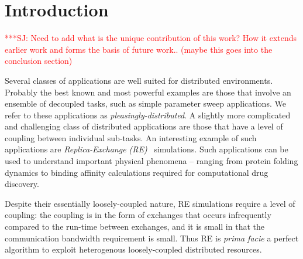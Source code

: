\documentclass{rspublic}
\newcommand{\alnote}[1]{ {\textcolor{blue} { ***AL: #1 }}}
\newcommand{\jhanote}[1]{ {\textcolor{red} { ***SJ: #1 }}}
\newcommand{\alnote}[1]{}
\newcommand{\jhanote}[1]{}
\begin{document}
\begin{abstract}{Replica-Exchange, SAGA, Migol, Fault Tolerance}
  \jhanote{In this paper, we describe the design, development and
    deployment of a unique framework for constructing fault-tolerant
    distributed simulations.}

  \jhanote{Less emphasis on the SAGA/Migol framework: The framework
    consists of two primary components -- SAGA and Migol, is scalable,
    general purpose and extensible.}

  \jhanote{I think this can go: We provide details of a newly
    developed functionality in SAGA -- the Checkpoint and Recovery
    API. Migol is an adaptive Grid middleware, which addresses the
    fault tolerance of Grid applications and services by providing the
    capability to recover applications from checkpoint files
    transparently.  In addition to describing the integration of
    SAGA-CPR with the Migol infrastructure,}
  \alnote{I added a small note about Migol to the abstract (I tried to keep
    it short.)}

  \jhanote{We also outline our experiences with running a large scale,
    general-purpose, SAGA-CPR based Replica-Exchange application in a
    production distributed environment.}

\end{abstract}

\section{Introduction}

\jhanote{Need to add what is the unique contribution of this work? How
  it extends earlier work and forms the basis of future work.. (maybe
  this goes into the conclusion section)}

Several classes of applications are well suited for distributed
environments. Probably the best known and most powerful examples are
those that involve an ensemble of decoupled tasks, such as simple
parameter sweep applications. We refer to these applications as {\it
  pleasingly-distributed}.  A slightly more complicated and
challenging class of distributed applications are those that have a
level of coupling between individual sub-tasks.  An interesting
example of such applications are \emph{Replica-Exchange
  (RE)}~\citep{hansmann,Sugita:1999rm} simulations.  Such applications
can be used to understand important physical phenomena -- ranging from
protein folding dynamics to binding affinity calculations required for
computational drug discovery.

Despite their essentially loosely-coupled nature, RE simulations
require a level of coupling: the coupling is in the form of exchanges
that occurs infrequently compared to the run-time between exchanges,
and it is small in that the communication bandwidth requirement is
small.  Thus RE is {\it prima facie} a perfect algorithm to exploit
heterogenous loosely-coupled distributed resources.
\end{document}
